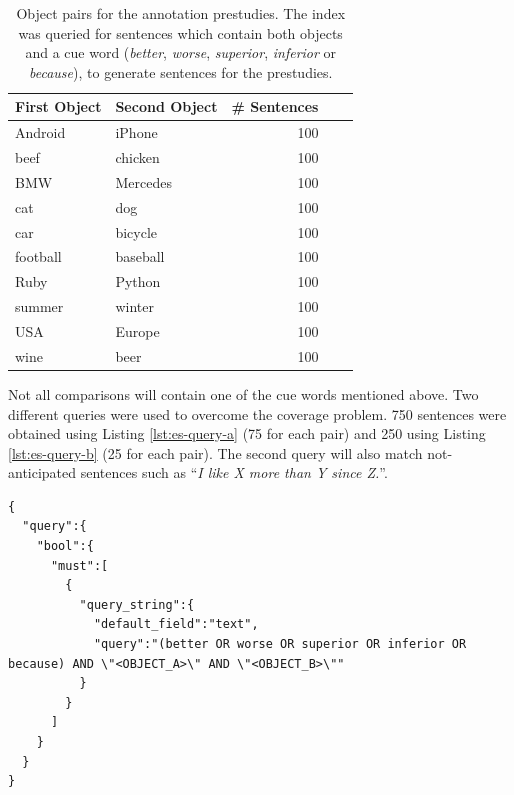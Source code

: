 \begin{table}[h]
\centering
\caption{Object pairs for the annotation prestudies. The index was queried for sentences which contain both objects and a cue word (\emph{better}, \emph{worse}, \emph{superior}, \emph{inferior} or \emph{because}), to generate sentences for the prestudies.}
\label{tbl:prestudy-objects}
\begin{tabular}{@{}llrrr@{}}
\toprule
First Object & Second Object      & \# Sentences                             \\ \midrule
Android & iPhone    &   100  \\
beef & chicken & 100   \\
BMW    & Mercedes    & 100  \\
cat & dog      &     100  \\ 
car & bicycle & 100 \\
football & baseball   &  100 \\ 
Ruby    & Python    & 100      \\
summer & winter &  100\\
USA & Europe & 100 \\
wine & beer  & 100  \\
\bottomrule  
                               
\end{tabular}
\end{table}

Not all comparisons will contain one of the cue words mentioned above. Two different queries were used to overcome the coverage problem. 750 sentences were obtained using Listing \ref{lst:es-query-a} (75 for each pair) and 250 using Listing \ref{lst:es-query-b} (25 for each pair). The second query will also match not-anticipated sentences such as \enquote{\emph{I like X more than Y since Z.}}.



\begin{lstlisting}[label=lst:es-query-a,breaklines=true,postbreak=\mbox{\textcolor{red}{$\hookrightarrow$}\space},caption=The first query used to extract the sentences for the prestudies from the Elasticsearch index. OBJECT\_A and OBJECT\_B are placeholders for the first and second object.]
{
  "query":{
    "bool":{
      "must":[
        {
          "query_string":{
            "default_field":"text",
            "query":"(better OR worse OR superior OR inferior OR because) AND \"<OBJECT_A>\" AND \"<OBJECT_B>\""
          }
        }
      ]
    }
  }
}
\end{lstlisting}

